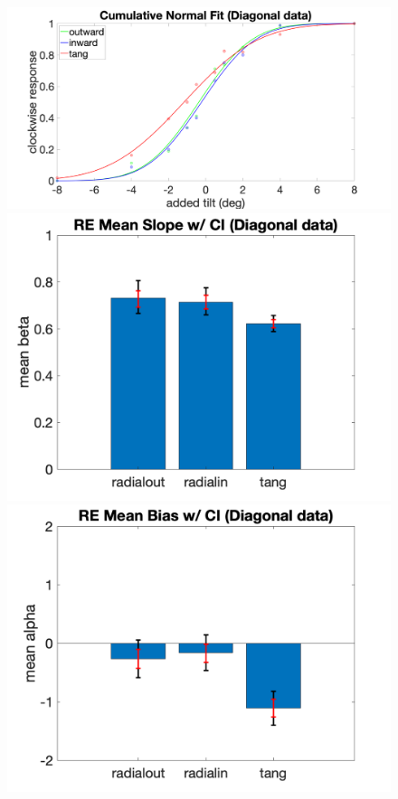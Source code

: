 \documentclass[11pt]{article} %
\begin{document}
\begin{figure}[H]
\includegraphics[scale=.06]{Images/PF_obl.png}
\includegraphics[scale=.11]{Images/MeanSlopeError_obl.png}
\includegraphics[scale=.11]{Images/MeanBiasError_obl.png}

\end{figure}
\end{document}
